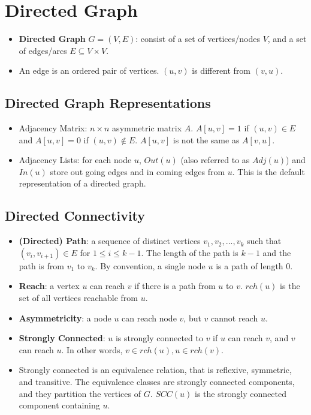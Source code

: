 
\section{Directed Graph}
\begin{itemize}
    \item \textbf{Directed Graph} $G = (V, E)$: consist of a set of vertices/nodes $V$, and a set of edges/arcs $E \subseteq V \times V$.
    \item An edge is an ordered pair of vertices. $(u, v)$ is different from $(v, u)$.
\end{itemize}

\subsection{Directed Graph Representations}
\begin{itemize}
    \item Adjacency Matrix: $n \times n$ asymmetric matrix $A$. $A[u, v] = 1$ if $(u, v) \in E$ and $A[u, v] = 0$ if $(u, v) \notin E$. $A[u, v]$ is not the same as $A[v, u]$.
    \item Adjacency Lists: for each node $u$, $Out(u)$ (also referred to as $Adj(u)$) and $In(u)$ store out going edges and in coming edges from $u$. This is the default representation of a directed graph.
\end{itemize}

\subsection{Directed Connectivity}
\begin{itemize}
    \item \textbf{(Directed) Path}: a sequence of distinct vertices $v_1, v_2, ..., v_k$ such that $(v_i, v_{i + 1}) \in E$ for $1 \leq i \leq k - 1$. The length of the path is $k - 1$ and the path is from $v_1$ to $v_k$. By convention, a single node $u$ is a path of length $0$.
    \item \textbf{Reach}: a vertex $u$ can reach $v$ if there is a path from $u$ to $v$. $rch(u)$ is the set of all vertices reachable from $u$.
    \item \textbf{Asymmetricity}: a node $u$ can reach node $v$, but $v$ cannot reach $u$.
    \item \textbf{Strongly Connected}: $u$ is strongly connected to $v$ if $u$ can reach $v$, and $v$ can reach $u$. In other words, $v \in rch(u), u \in rch(v)$.
    \item Strongly connected is an equivalence relation, that is reflexive, symmetric, and transitive. The equivalence classes are strongly connected components, and they partition the vertices of $G$. $SCC(u)$ is the strongly connected component containing $u$.
\end{itemize}

